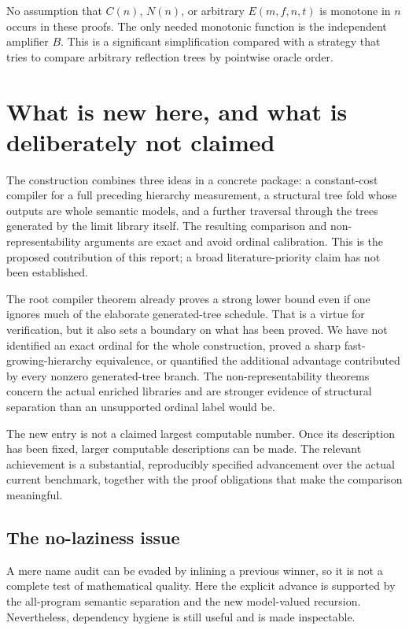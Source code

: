 \documentclass[11pt,letterpaper]{article}
\theoremstyle{definition}
\begin{document}
No assumption that $C(n)$, $N(n)$, or arbitrary $E(m,f,n,t)$ is monotone in $n$
occurs in these proofs. The only needed monotonic function is the independent
amplifier $B$. This is a significant simplification compared with a strategy
that tries to compare arbitrary reflection trees by pointwise oracle order.

\section{What is new here, and what is deliberately not claimed}
\label{sec:scope}

The construction combines three ideas in a concrete package: a constant-cost
compiler for a full preceding hierarchy measurement, a structural tree fold
whose outputs are whole semantic models, and a further traversal through the
trees generated by the limit library itself. The resulting comparison and
non-representability arguments are exact and avoid ordinal calibration. This
is the proposed contribution of this report; a broad literature-priority claim
has not been established.

The root compiler theorem already proves a strong lower bound even if one
ignores much of the elaborate generated-tree schedule. That is a virtue for
verification, but it also sets a boundary on what has been proved. We have not
identified an exact ordinal for the whole construction, proved a sharp
fast-growing-hierarchy equivalence, or quantified the additional advantage
contributed by every nonzero generated-tree branch. The non-representability
theorems concern the actual enriched libraries and are stronger evidence of
structural separation than an unsupported ordinal label would be.

The new entry is not a claimed largest computable number. Once its description
has been fixed, larger computable descriptions can be made. The relevant
achievement is a substantial, reproducibly specified advancement over the
actual current benchmark, together with the proof obligations that make the
comparison meaningful.

\subsection{The no-laziness issue}

A mere name audit can be evaded by inlining a previous winner, so it is not a
complete test of mathematical quality. Here the explicit advance is supported
by the all-program semantic separation and the new model-valued recursion.
Nevertheless, dependency hygiene is still useful and is made inspectable.
\end{document}
